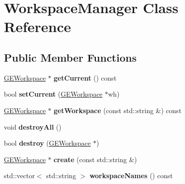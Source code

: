 \hypertarget{class_workspace_manager}{\section{Workspace\-Manager Class Reference}
\label{class_workspace_manager}
}
\subsection*{Public Member Functions}
\begin{DoxyCompactItemize}
\item 
\hypertarget{class_workspace_manager_a765a97c906c93cfffef54735e37409c9}{\hyperlink{class_g_e_workspace}{G\-E\-Workspace} $\ast$ {\bfseries get\-Current} () const }\label{class_workspace_manager_a765a97c906c93cfffef54735e37409c9}

\item 
\hypertarget{class_workspace_manager_a1aee8705de2d071b6cce59dc83081ff6}{bool {\bfseries set\-Current} (\hyperlink{class_g_e_workspace}{G\-E\-Workspace} $\ast$wh)}\label{class_workspace_manager_a1aee8705de2d071b6cce59dc83081ff6}

\item 
\hypertarget{class_workspace_manager_aacfad04ff55dffd5880cf71208ef5160}{\hyperlink{class_g_e_workspace}{G\-E\-Workspace} $\ast$ {\bfseries get\-Workspace} (const std\-::string \&) const }\label{class_workspace_manager_aacfad04ff55dffd5880cf71208ef5160}

\item 
\hypertarget{class_workspace_manager_a5a50cb8c0943409770b0e99ce43cd4d3}{void {\bfseries destroy\-All} ()}\label{class_workspace_manager_a5a50cb8c0943409770b0e99ce43cd4d3}

\item 
\hypertarget{class_workspace_manager_a3d94a98f51e2ff65c32b39aba1493854}{bool {\bfseries destroy} (\hyperlink{class_g_e_workspace}{G\-E\-Workspace} $\ast$)}\label{class_workspace_manager_a3d94a98f51e2ff65c32b39aba1493854}

\item 
\hypertarget{class_workspace_manager_ac043289ca971369537d9e766494b3522}{\hyperlink{class_g_e_workspace}{G\-E\-Workspace} $\ast$ {\bfseries create} (const std\-::string \&)}\label{class_workspace_manager_ac043289ca971369537d9e766494b3522}

\item 
\hypertarget{class_workspace_manager_aeeccf48a219f7d1a96a8eb0f043a0ae1}{std\-::vector$<$ std\-::string $>$ {\bfseries workspace\-Names} () const }\label{class_workspace_manager_aeeccf48a219f7d1a96a8eb0f043a0ae1}


\end{DoxyCompactItemize}
